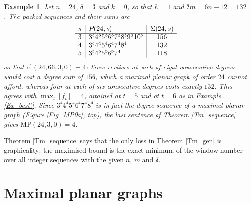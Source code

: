 \documentclass[12pt,a4paper]{article}%
\newtheorem{example}[theorem]{Example}
\begin{document}
\begin{example}
\label{Ex_sstar}Let $n=24$, $\delta =3$ and $k=0$, so that $h=1$ and
$2m=6n-12=132$. The packed sequences and their sums are
\[
\begin{array}
[c]{c|l|c}%
s & P(24,s) & \Sigma (24,s)\\\hline
3 & 3^{3}4^{3}5^{3}6^{3}7^{3}8^{3}9^{3}10^{3} & 156\\
4 & 3^{4}4^{4}5^{4}6^{4}7^{4}8^{4} & 132\\
5 & 3^{5}4^{5}5^{5}6^{5}7^{4} & 118
\end{array}
\]
so that $s^{\ast }(24,66,3,0)=4$: three vertices at each of eight consecutive
degrees would cost a degree sum of $156$, which a maximal planar graph of order $24$
cannot afford, whereas four at each of six consecutive degrees costs exactly
$132$. This agrees with $\max_{t}\left\lceil f_{t}\right\rceil =4$, attained at
$t=5$ and at $t=6$ as in Example \ref{Ex_bestt}. Since
$3^{4}4^{4}5^{4}6^{4}7^{4}8^{4}$ is in fact the degree sequence of a
maximal planar graph (Figure \ref{Fig_MP0a}, top), the last sentence of Theorem
\ref{Tm_sequence} gives $\mathrm{MP}(24,3,0)=4$.
\end{example}



Theorem \ref{Tm_sequence} says that the only loss in Theorem \ref{Tm_gen} is graphicality: the maximised bound is
the exact minimum of the window number over all integer sequences with the given $n$, $m$ and $\delta $.

\section{Maximal planar graphs}
\label{Sec_planar}
\end{document}
